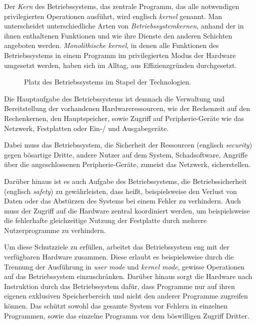 \documentclass[12pt]{article}
\begin{document}
Der \emph{Kern} des Betriebssystems, das zentrale Programm, das alle notwendigen privilegierten Operationen ausführt, wird englisch \emph{kernel} genannt.
Man unterscheidet unterschiedliche Arten von \emph{Betriebssystemkernen}, anhand der in ihnen enthaltenen Funktionen und wie ihre Dienste den anderen Schichten angeboten werden.
\emph{Monolithische kernel}, in denen alle Funktionen des Betriebssystems in einem Programm im privilegierten Modus der Hardware umgesetzt werden, haben sich im Alltag, aus Effizienzgründen durchgesetzt.

\begin{wrapfigure}{r}{8.7cm}

\caption{Platz des Betriebssystems im Stapel der Technologien.}
\label{fig:stack}
\end{wrapfigure}

Die Hauptaufgabe des Betriebssystems ist demnach die Verwaltung und Bereitstellung der vorhandenen Hardwareressourcen, wie der Rechenzeit auf den Rechenkernen, den Hauptspeicher, sowie Zugriff auf Peripherie-Geräte wie das Netzwerk, Festplatten oder Ein-/ und Ausgabegeräte.

\label{sec:security_safety}
Dabei muss das Betriebssystem, die Sicherheit der Ressourcen (englisch \emph{security}) gegen bösartige Dritte, andere Nutzer auf dem System, Schadsoftware, Angriffe über die angeschlossenen Peripherie-Geräte, zumeist das Netzwerk, sicherstellen.

Darüber hinaus ist es auch Aufgabe des Betriebssystems, die Betriebssicherheit (englisch \emph{safety}) zu gewährleisten, dass heißt, beispielsweise den Verlust von Daten oder das Abstürzen des Systems bei einem Fehler zu verhindern.
Auch muss der Zugriff auf die Hardware zentral koordiniert werden, um beispielsweise die fehlerhafte gleichzeitige Nutzung der Festplatte durch mehrere Nutzerprogramme zu verhindern.

Um diese Schutzziele zu erfüllen, arbeitet das Betriebssystem eng mit der verfügbaren Hardware zusammen.
Diese erlaubt es beispielsweise durch die Trennung der Ausführung in \textit{user mode} und \textit{kernel mode}, gewisse Operationen auf das Betriebssystem einzuschränken.
Darüber hinaus sorgt die Hardware nach Instruktion durch das Betriebssystem dafür, dass Programme nur auf ihren eigenen exklusiven Speicherbereich und nicht den anderer Programme zugreifen können.
Das schützt sowohl das gesamte System vor Fehlern in einzelnen Programmen, sowie das einzelne Programm vor dem böswilligen Zugriff Dritter.
\end{document}
